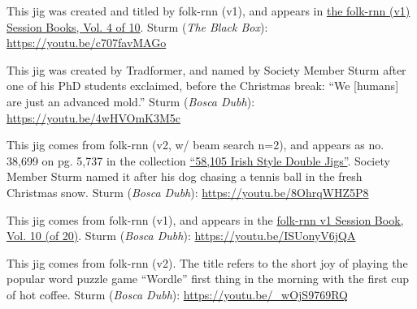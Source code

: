 \documentclass[a4paper,notitlepage,twoside]{book}
\begin{document}
{}
\hypertarget{jig:CunningStorm}{}
This jig was created and titled by folk-rnn (v1),
and appears in \href{https://highnoongmt.wordpress.com/2018/01/05/volumes-1-20-of-folk-rnn-v1-transcriptions}{the folk-rnn (v1) Session Books, Vol. 4 of 10}.
Sturm ({\em The Black Box}): \url{https://youtu.be/c707favMAGo}

{}
\hypertarget{jig:mold}{}
This jig was created by Tradformer, and named by Society Member Sturm
after one of his PhD students exclaimed, before the Christmas break:
``We [humans] are just an advanced mold.''
Sturm ({\em Bosca Dubh}): \url{https://youtu.be/4wHVOmK3M5c}

{}
\hypertarget{jig:chasingballs}{}
This jig comes from folk-rnn (v2, w/ beam search n=2),
and appears as no. 38,699 on pg. 5,737 in the collection
\href{http://urn.kb.se/resolve?urn=urn:nbn:se:kth:diva-296578}{``58,105 Irish Style Double Jigs''}.
Society Member Sturm named it after his dog chasing a tennis ball in the fresh Christmas snow.
Sturm ({\em Bosca Dubh}): \url{https://youtu.be/8OhrqWHZ5P8}

{}
\hypertarget{jig:OptolyLouden}{}
This jig comes from folk-rnn (v1), 
and appears in the \href{https://highnoongmt.wordpress.com/2018/01/05/volumes-1-20-of-folk-rnn-v1-transcriptions/}{folk-rnn v1 Session Book, Vol. 10 (of 20)}.
Sturm ({\em Bosca Dubh}): \url{https://youtu.be/ISUonyV6jQA}

{}
\hypertarget{jig:Wordle}{}
This jig comes from folk-rnn (v2).
The title refers to the short joy of playing the
popular word puzzle game ``Wordle'' first thing in the morning
with the first cup of hot coffee.
Sturm ({\em Bosca Dubh}): \url{https://youtu.be/_wOjS9769RQ}
\end{document}
